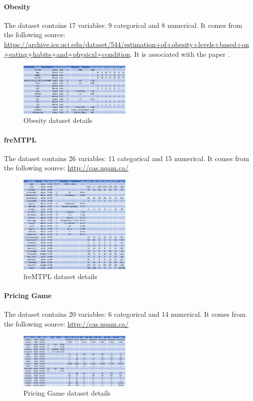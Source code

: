 \documentclass{article}
\theoremstyle{definition}
\begin{document}
\paragraph{Obesity}
The dataset contains 17 variables: 9 categorical and 8 numerical. It comes from the following source: \url{https://archive.ics.uci.edu/dataset/544/estimation+of+obesity+levels+based+on+eating+habits+and+physical+condition}. It is associated with the paper \citep{palechor2019dataset}.
\begin{figure}[H]
     \centering
     \includegraphics[width=0.49\textwidth]{imgs/Dataset_Details/Obesity_Details.png}
     \caption{Obesity dataset details}
\end{figure}



\paragraph{freMTPL}
The dataset contains 26 variables: 11 categorical and 15 numerical. It comes from the following source: \url{http://cas.uqam.ca/}
\begin{figure}[H]
     \centering
     \includegraphics[width=0.49\textwidth]{imgs/Dataset_Details/freMTPL_Details.png}
     \caption{freMTPL dataset details}
\end{figure}



\paragraph{Pricing Game}
The dataset contains 20 variables: 6 categorical and 14 numerical. It comes from the following source: \url{http://cas.uqam.ca/}
\begin{figure}[H]
     \centering
     \includegraphics[width=0.49\textwidth]{imgs/Dataset_Details/PricingGame_Details.png}
     \caption{Pricing Game dataset details}
\end{figure}
\end{document}
